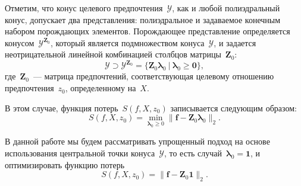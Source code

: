 \documentclass{elsarticle}
\newcommand{\bfx}{\mathbf{f}}
\newcommand{\bZ}{\mathbf{Z}}
\newcommand{\blambda}{\boldsymbol{\lambda}}
\newcommand{\cY}{\mathcal{Y}}
\begin{document}

Отметим, что конус целевого предпочтения~$\cY$, как и любой полиэдральный конус, допускает два представления: полиэдральное и задаваемое конечным набором порождающих элементов. Порождающее представление определяется конусом~$\cY^{\bZ_0}$, который является подмножеством конуса~$\cY$, и задается неотрицательной линейной комбинацией столбцов матрицы~$\bZ_0$:
\begin{equation}
\cY\supset\cY^{\bZ_0}=\{\bZ_0\blambda_0~|~\blambda_0\geq\mathbf{0}\},
\label{eq:FinGenY}
\end{equation}
где~$\bZ_0$~--- матрица предпочтений, соответствующая целевому отношению предпочтения~$z_0$, определенному на~$X$.

В этом случае, функция потерь~$S(f,X,z_0)$ записывается следующим образом:
\begin{equation}
S(f,X,z_0)=\min\limits_{\blambda_0 \geq 0}\|\bfx-\bZ_0\blambda_0\|_2.
\label{eq:LossFinGen}
\end{equation}

В данной работе мы будем рассматривать упрощенный подход на основе использования центральной точки конуса~$\cY$, то есть случай~$\blambda_0=\mathbf{1}$, и оптимизировать функцию потерь
\begin{equation}
S(f,X,z_0)=\|\bfx-\bZ_0\mathbf{1}\|_2.
\label{eq:LossFinGenStrict}
\end{equation}
\end{document}
